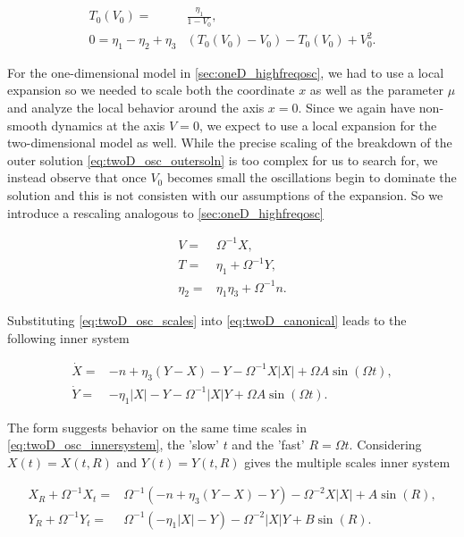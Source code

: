 \begin{equation*} \label{eq:twoD_lowerleadingorder}
\begin{aligned}
T_0(V_0)=&\frac{\eta_1}{1-V_0},\\
0=\eta_1-\eta_2+\eta_3&(T_0(V_0)-V_0)-T_0(V_0)+V_0^2.
\end{aligned}
\end{equation*}

For the one-dimensional model in \autoref{sec:oneD_highfreqosc}, we had to use a local expansion so we needed to scale both the coordinate $x$ as well as the parameter $\mu$ and analyze the local behavior around the axis $x=0$. Since we again have non-smooth dynamics at the axis $V=0$, we expect to use a local expansion for the two-dimensional model as well. While the precise scaling of the breakdown of the outer solution \eqref{eq:twoD_osc_outersoln} is too complex for us to search for, we instead observe that once $V_0$ becomes small the oscillations begin to dominate the solution and this is not consisten with our assumptions of the expansion. So we introduce a rescaling analogous to  \autoref{sec:oneD_highfreqosc}

\begin{equation}\label{eq:twoD_osc_scales}
\begin{aligned}
V=&\Omega^{-1}X,\\
T=& \eta_1 +\Omega^{-1}Y,\\
\eta_2=&\eta_1\eta_3+\Omega^{-1} n.
\end{aligned}
\end{equation}

Substituting \eqref{eq:twoD_osc_scales} into \eqref{eq:twoD_canonical} leads to the following inner system

\begin{equation}\label{eq:twoD_osc_innersystem}
\begin{aligned}
\dot{X}=& -n+\eta_3(Y-X)-Y-\Omega^{-1}X|X| +\Omega A\sin(\Omega t),\\
\dot{Y}=& -\eta_1|X|-Y -\Omega^{-1}|X|Y +\Omega A \sin(\Omega t).
\end{aligned}
\end{equation}

The form suggests behavior on the same time scales in \eqref{eq:twoD_osc_innersystem}, the 'slow' $t$ and the 'fast' $R=\Omega t$. Considering $X(t)=X(t,R)$ and $Y(t)=Y(t,R)$ gives the multiple scales inner system

\begin{equation}\label{eq:twoD_osc_innermulti}
\begin{aligned}
X_R+\Omega^{-1}X_t =& \Omega^{-1}\left(-n +\eta_3(Y-X)-Y\right)-\Omega^{-2}X|X|+A\sin(R),\\
Y_R+\Omega^{-1}Y_t =& \Omega^{-1}\left(-\eta_1|X|-Y\right)-\Omega^{-2}|X|Y+ B\sin(R).
\end{aligned}
\end{equation}

